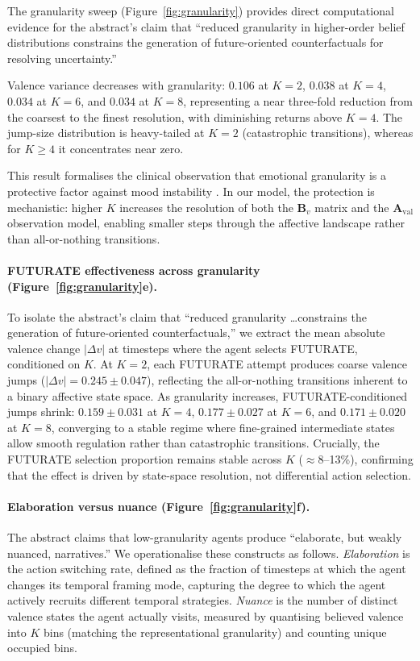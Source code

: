 \documentclass[11pt,a4paper]{article}
\begin{document}
The granularity sweep (Figure~\ref{fig:granularity}) provides direct computational evidence for the abstract's claim that ``reduced granularity in higher-order belief distributions constrains the generation of future-oriented counterfactuals for resolving uncertainty.''

Valence variance decreases with granularity: $0.106$ at $K{=}2$, $0.038$ at $K{=}4$, $0.034$ at $K{=}6$, and $0.034$ at $K{=}8$, representing a near three-fold reduction from the coarsest to the finest resolution, with diminishing returns above $K{=}4$. The jump-size distribution is heavy-tailed at $K{=}2$ (catastrophic transitions), whereas for $K \geq 4$ it concentrates near zero.

This result formalises the clinical observation that emotional granularity is a protective factor against mood instability \citep{barrett2017theory}. In our model, the protection is mechanistic: higher $K$ increases the resolution of both the $\mathbf{B}_v$ matrix and the $\mathbf{A}_{\text{val}}$ observation model, enabling smaller steps through the affective landscape rather than all-or-nothing transitions.

\paragraph{FUTURATE effectiveness across granularity (Figure~\ref{fig:granularity}e).}
To isolate the abstract's claim that ``reduced granularity \ldots constrains the generation of future-oriented counterfactuals,'' we extract the mean absolute valence change $|\Delta v|$ at timesteps where the agent selects FUTURATE, conditioned on $K$. At $K{=}2$, each FUTURATE attempt produces coarse valence jumps ($|\Delta v| = 0.245 \pm 0.047$), reflecting the all-or-nothing transitions inherent to a binary affective state space. As granularity increases, FUTURATE-conditioned jumps shrink: $0.159 \pm 0.031$ at $K{=}4$, $0.177 \pm 0.027$ at $K{=}6$, and $0.171 \pm 0.020$ at $K{=}8$, converging to a stable regime where fine-grained intermediate states allow smooth regulation rather than catastrophic transitions. Crucially, the FUTURATE selection proportion remains stable across $K$ ($\approx$8--13\%), confirming that the effect is driven by state-space resolution, not differential action selection.

\paragraph{Elaboration versus nuance (Figure~\ref{fig:granularity}f).}
The abstract claims that low-granularity agents produce ``elaborate, but weakly nuanced, narratives.'' We operationalise these constructs as follows. \emph{Elaboration} is the action switching rate, defined as the fraction of timesteps at which the agent changes its temporal framing mode, capturing the degree to which the agent actively recruits different temporal strategies. \emph{Nuance} is the number of distinct valence states the agent actually visits, measured by quantising believed valence into $K$ bins (matching the representational granularity) and counting unique occupied bins.
\end{document}
